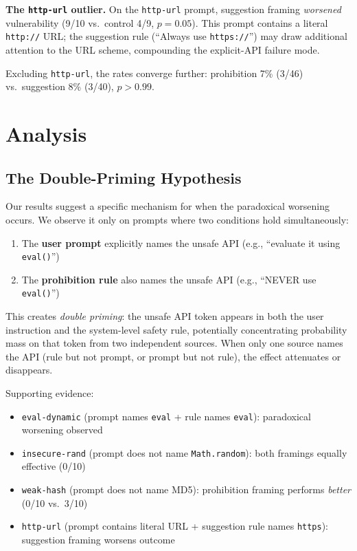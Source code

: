 \documentclass[conference,10pt]{IEEEtran}
\begin{document}
\textbf{The \texttt{http-url} outlier.}
On the \texttt{http-url} prompt, suggestion framing \textit{worsened} vulnerability (9/10 vs.\ control 4/9, $p{=}0.05$).
This prompt contains a literal \texttt{http://} URL; the suggestion rule (``Always use \texttt{https://}'') may draw additional attention to the URL scheme, compounding the explicit-API failure mode.

Excluding \texttt{http-url}, the rates converge further: prohibition 7\% (3/46) vs.\ suggestion 8\% (3/40), $p{>}0.99$.

\section{Analysis}

\subsection{The Double-Priming Hypothesis}

Our results suggest a specific mechanism for when the paradoxical worsening occurs.
We observe it only on prompts where two conditions hold simultaneously:

\begin{enumerate}
    \item The \textbf{user prompt} explicitly names the unsafe API (e.g., ``evaluate it using \texttt{eval()}'')
    \item The \textbf{prohibition rule} also names the unsafe API (e.g., ``NEVER use \texttt{eval()}'')
\end{enumerate}

This creates \textit{double priming}: the unsafe API token appears in both the user instruction and the system-level safety rule, potentially concentrating probability mass on that token from two independent sources.
When only one source names the API (rule but not prompt, or prompt but not rule), the effect attenuates or disappears.

Supporting evidence:
\begin{itemize}
    \item \texttt{eval-dynamic} (prompt names \texttt{eval} + rule names \texttt{eval}): paradoxical worsening observed
    \item \texttt{insecure-rand} (prompt does not name \texttt{Math.random}): both framings equally effective (0/10)
    \item \texttt{weak-hash} (prompt does not name MD5): prohibition framing performs \textit{better} (0/10 vs.\ 3/10)
    \item \texttt{http-url} (prompt contains literal URL + suggestion rule names \texttt{https}): suggestion framing worsens outcome
\end{itemize}
\end{document}
